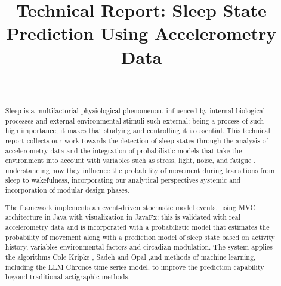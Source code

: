 \documentclass[conference]{IEEEtran}
\begin{document}
\title{Technical Report: Sleep State Prediction Using Accelerometry Data}

\author{
	\\
	\and
}

\maketitle

\begin{abstract}
	Sleep is a multifactorial physiological phenomenon.
influenced by internal biological processes and external environmental stimuli such external\cite{Sadeh1994}; being a process of such high importance, it makes that studying and controlling it is essential. This technical report collects our work towards the detection of sleep states
through the analysis of accelerometry data and the integration of
probabilistic models that take the environment into account with
variables such as stress, light, noise, and fatigue \cite{AccelerometryReview}, understanding how they influence the probability of movement during transitions from sleep to wakefulness, incorporating our analytical perspectives systemic and incorporation of modular design phases.

The framework implements an event-driven stochastic model events, using MVC architecture in Java with visualization in JavaFx; this is validated with real accelerometry data \cite{Kaggle}  and is incorporated with a probabilistic model that estimates the probability of movement along with a prediction model of sleep state based on activity history, variables environmental factors and circadian modulation. The system applies the algorithms Cole Kripke \cite{ColeKripke}, Sadeh\cite{Sadeh1994} and Opal \cite{Opal2020},and methods of machine learning, including the LLM Chronos time series model\cite{Chronos}, to improve the prediction capability beyond traditional actigraphic methods.
\end{abstract}
\end{document}
